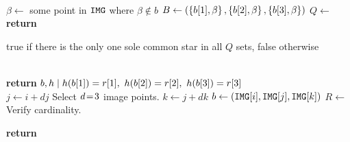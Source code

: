 \begin{algorithm}
\begin{algorithmic}[1]
        \EndFunction
        \\
        \State $\beta \gets $ some point in $\texttt{IMG}$ where $\beta \notin b$
        \State $B \gets \left(\left\{ b[1], \beta \right\}, \left\{ b[2], \beta \right\}, \left\{ b[3], \beta \right\}\right)$
        \State $Q \gets $ 
        \State \textbf{return} \parbox[t]{0.8\textwidth}{true if there is the only one sole common star  \newline in all $Q$ sets, false otherwise}
        \EndFunction
        \\
        \State \textbf{return} $\imagesubset, \solutionmap \mid \solutionmap(\imagesubset[1]) = \candidateset[1], \ \solutionmap(\imagesubset[2]) = \candidateset[2], \ \solutionmap(\imagesubset[3]) = \candidateset[3]$
        \EndFunction
        \\
         \label{algline:pyramidI}
         \label{algline:pyramidJ}
         \label{algline:pyramidK}
        \State $j \gets i + dj$ \Comment Select $d\!=\! 3$ image points.
        \State $k \gets j + dk$ 
        \State $b \gets \left(\texttt{IMG}[i], \texttt{IMG}[j], \texttt{IMG}[k]\right)$
        \State $R \gets $ 
         \Comment Verify cardinality.
        
        \State \textbf{return}  
        \EndIf
        \EndIf
        \EndFor
        \EndFor
        \EndFor
        \EndProcedure
    \end{algorithmic}
\end{algorithm}

